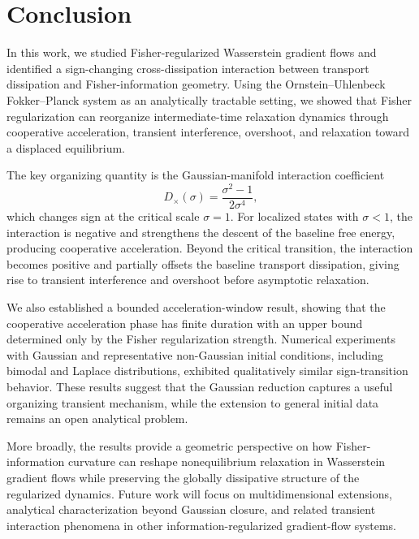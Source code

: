 \documentclass[aps,prl,twocolumn,10pt,superscriptaddress]{revtex4-2}
\begin{document}
\section{Conclusion}
\label{sec:conclusion}

In this work, we studied Fisher-regularized Wasserstein gradient flows and identified a sign-changing cross-dissipation interaction between transport dissipation and Fisher-information geometry. Using the Ornstein--Uhlenbeck Fokker--Planck system as an analytically tractable setting, we showed that Fisher regularization can reorganize intermediate-time relaxation dynamics through cooperative acceleration, transient interference, overshoot, and relaxation toward a displaced equilibrium.

The key organizing quantity is the Gaussian-manifold interaction coefficient
\[
D_\times(\sigma)
=
\frac{\sigma^2-1}{2\sigma^4},
\]
which changes sign at the critical scale $\sigma=1$. For localized states with $\sigma<1$, the interaction is negative and strengthens the descent of the baseline free energy, producing cooperative acceleration. Beyond the critical transition, the interaction becomes positive and partially offsets the baseline transport dissipation, giving rise to transient interference and overshoot before asymptotic relaxation.

We also established a bounded acceleration-window result, showing that the cooperative acceleration phase has finite duration with an upper bound determined only by the Fisher regularization strength. Numerical experiments with Gaussian and representative non-Gaussian initial conditions, including bimodal and Laplace distributions, exhibited qualitatively similar sign-transition behavior. These results suggest that the Gaussian reduction captures a useful organizing transient mechanism, while the extension to general initial data remains an open analytical problem.

More broadly, the results provide a geometric perspective on how Fisher-information curvature can reshape nonequilibrium relaxation in Wasserstein gradient flows while preserving the globally dissipative structure of the regularized dynamics. Future work will focus on multidimensional extensions, analytical characterization beyond Gaussian closure, and related transient interaction phenomena in other information-regularized gradient-flow systems.






\end{document}
